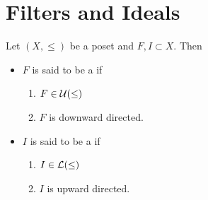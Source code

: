 \documentclass{book}
\begin{document}
	
	
	
	
	
	
	
	
	
	
	
	
	
	
	
	
	
	
	
	
	
	
	
	
	
	
	\section{Filters and Ideals}
	
	\begin{defn}
		Let $(X, \leq)$ be a poset and $F, I \subset X$. Then 
		\begin{itemize}
			\item $F$ is said to be a  if 
			\begin{enumerate}
				\item $F \in \mathcal{U}(\leq)$ 
				\item $F$ is downward directed.
			\end{enumerate}
			\item $I$ is said to be a  if 
			\begin{enumerate}
				\item $I \in \mathcal{L}(\leq)$ 
				\item $I$ is upward directed.
			\end{enumerate}
		\end{itemize} 
	\end{defn}
	
	\begin{defn}
		
	\end{defn}
	
	
	
	
	
	
	
	
	
	
	
	
	
	
	
	
	
	
	
	
	
	
	
	
	
	
	
\end{document}
